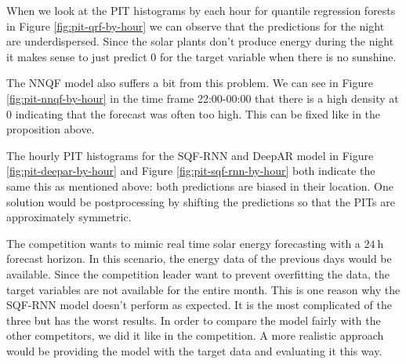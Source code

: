 When we look at the PIT histograms by each hour 
for quantile regression forests in Figure \ref{fig:pit-qrf-by-hour} 
we can observe that the predictions for the night are underdispersed. 
Since the solar plants don't produce energy during the night 
it makes sense to just predict \(0\) for the target variable when there is 
no sunshine.

The NNQF model also suffers a bit from this problem. We can see 
in Figure \ref{fig:pit-nnqf-by-hour} in the time frame 22:00-00:00 that 
there is a high density at \(0\) indicating that the forecast 
was often too high. This can be fixed like in the proposition above.

The hourly PIT histograms for the SQF-RNN and DeepAR model in 
Figure \ref{fig:pit-deepar-by-hour} and Figure \ref{fig:pit-sqf-rnn-by-hour} 
both indicate the same this as mentioned above: both predictions are biased 
in their location. One solution would be postprocessing by shifting the 
predictions so that the PITs are approximately symmetric. 

The competition wants to mimic real time solar energy forecasting with 
a \(\SI{24}{\hour}\) forecast horizon. In this scenario, the energy data of 
the previous days would be available. Since the competition leader want to 
prevent overfitting the data, the target variables are not available for 
the entire month. This is one reason why the SQF-RNN model doesn't perform 
as expected. 
It is the most complicated of the three but has the worst results. 
In order to compare the model fairly with the other competitors, 
we did it like in the competition. A more realistic approach would be 
providing the model with the target data and evaluating it this way.
